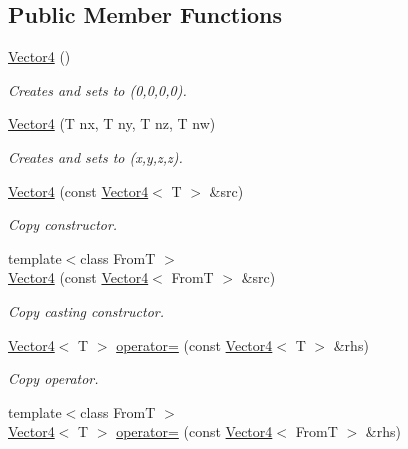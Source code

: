 \subsection*{Public Member Functions}
\begin{DoxyCompactItemize}
\item 
\hyperlink{class_vector4_afdef97d94e5697622b5322637028accf}{Vector4} ()
\begin{DoxyCompactList}\small\item\em Creates and sets to (0,0,0,0). \item\end{DoxyCompactList}\item 
\hyperlink{class_vector4_a6a51b14dfcb4b1bb4b0252f76e602ec8}{Vector4} (T nx, T ny, T nz, T nw)
\begin{DoxyCompactList}\small\item\em Creates and sets to (x,y,z,z). \item\end{DoxyCompactList}\item 
\hyperlink{class_vector4_ae20ddb27878b88964f059495b7311f35}{Vector4} (const \hyperlink{class_vector4}{Vector4}$<$ T $>$ \&src)
\begin{DoxyCompactList}\small\item\em Copy constructor. \item\end{DoxyCompactList}\item 
{\footnotesize template$<$class FromT $>$ }\\\hyperlink{class_vector4_afedec40c43f916ee0951d98c41676a0f}{Vector4} (const \hyperlink{class_vector4}{Vector4}$<$ FromT $>$ \&src)
\begin{DoxyCompactList}\small\item\em Copy casting constructor. \item\end{DoxyCompactList}\item 
\hyperlink{class_vector4}{Vector4}$<$ T $>$ \hyperlink{class_vector4_ace35647d296fb7b9d59083f2a4a7fa7a}{operator=} (const \hyperlink{class_vector4}{Vector4}$<$ T $>$ \&rhs)
\begin{DoxyCompactList}\small\item\em Copy operator. \item\end{DoxyCompactList}\item 
{\footnotesize template$<$class FromT $>$ }\\\hyperlink{class_vector4}{Vector4}$<$ T $>$ \hyperlink{class_vector4_a11f1097f1ff61938d79344f9cd28aad2}{operator=} (const \hyperlink{class_vector4}{Vector4}$<$ FromT $>$ \&rhs)

\end{DoxyCompactItemize}
